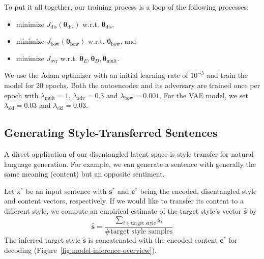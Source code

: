 \documentclass[11pt,a4paper]{article}
\newcommand{\rmx}{\mathrm x}
\newcommand{\loss}[1]{J_\text{#1}}
\begin{document}
To put it all together, our training process is a loop of the following processes:
\begin{itemize}
	\item minimize $\loss{dis}(\bm\theta_\text{dis})$ w.r.t. $\bm\theta_\text{dis}$,
	\item minimize $\loss{bow}(\bm\theta_\text{bow})$ w.r.t. $\bm\theta_\text{bow}$, and
	\item minimize $\loss{ovr}$ w.r.t. $\bm\theta_E, \bm\theta_D, \bm\theta_\text{mult}$.
\end{itemize}

We use the Adam optimizer \cite{kingma2014adam} with an initial learning rate of $10^{-3}$ and train the model for 20 epochs. Both the autoencoder and its adversary are trained once per epoch with $\lambda_\text{mult} = 1$, $\lambda_\text{adv} = 0.3$ and $\lambda_\text{bow} = 0.001$. For the VAE model, we set $\lambda_{\text{skl}} = 0.03$ and $\lambda_{\text{ckl}} = 0.03$.

\subsection{Generating Style-Transferred Sentences} \label{ss:prediction}

A direct application of our disentangled latent space is style transfer for natural language generation. For example, we can generate a sentence with generally the same meaning (content) but an opposite sentiment.

Let $\rmx^*$ be an input sentence with $\bm s^*$ and $\bm c^*$ being the encoded, disentangled style and content vectors, respectively. If we would like to transfer its content to a different style, we compute an empirical estimate of the target style's vector $\hat{\bm s}$ by
\begin{equation*}
	\hat{\bm s}=\frac{\sum_{i\in\text{target style}}\bm s_i}{\text{\# target style samples}}
\end{equation*}
The inferred target style $\hat{\bm s}$ is concatenated with the encoded content $\bm c^*$ for decoding (Figure~\ref{fig:model-inference-overview}).
\end{document}
